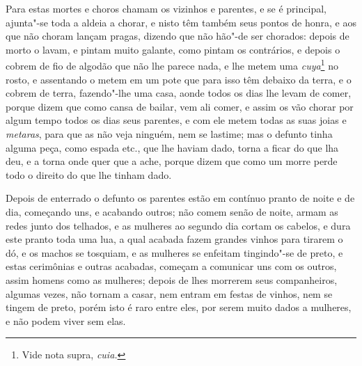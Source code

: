  Para estas mortes e choros chamam os vizinhos e parentes, e se é
principal, ajunta"-se toda a aldeia a chorar, e nisto têm também seus
pontos de honra, e aos que não choram lançam pragas, dizendo que não
hão"-de ser chorados: depois de morto o lavam, e pintam muito galante,
como pintam os contrários, e depois o cobrem de fio de algodão que não
lhe parece nada, e lhe metem uma \textit{cuya}\footnote{ Vide nota
supra, \textit{cuia.}} no rosto, e assentando o metem em um
pote que para isso têm debaixo da terra, e o cobrem de terra,
fazendo"-lhe uma casa, aonde todos os dias lhe levam de comer, porque
dizem que como cansa de bailar, vem ali comer, e assim os vão chorar
por algum tempo todos os dias seus parentes, e com ele metem todas as
suas joias e \textit{metaras}, para que as não veja ninguém, nem se
lastime; mas o defunto tinha alguma peça, como espada etc., que lhe
haviam dado, torna a ficar do que lha deu, e a torna onde quer que a
ache, porque dizem que como um morre perde todo o direito do que lhe tinham dado.

 Depois de enterrado o defunto os parentes estão em contínuo pranto de
noite e de dia, começando uns, e acabando outros; não comem senão de
noite, armam as redes junto dos telhados, e as mulheres ao segundo dia
cortam os cabelos, e dura este pranto toda uma lua, a qual acabada
fazem grandes vinhos para tirarem o dó, e os machos se tosquiam, e as
mulheres se enfeitam tingindo"-se de preto, e estas cerimônias e outras
acabadas, começam a comunicar uns com os outros, assim homens como as
mulheres; depois de lhes morrerem seus companheiros, algumas vezes, não
tornam a casar, nem entram em festas de vinhos, nem se tingem de preto,
porém isto é raro entre eles, por serem muito dados a mulheres, e não
podem viver sem elas.


